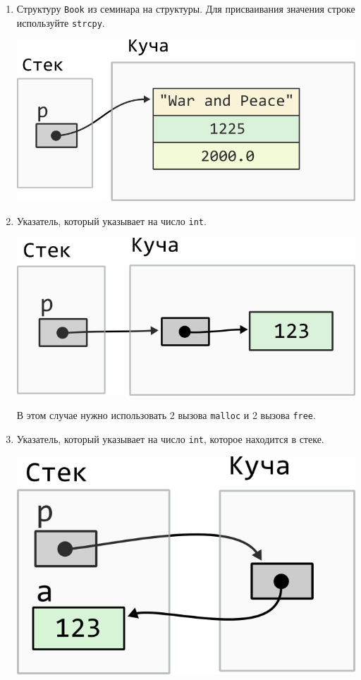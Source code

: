 \documentclass{article}
\begin{document}
\begin{enumerate}
\item Структуру \texttt{Book} из семинара на структуры. Для присваивания значения строке используйте \texttt{strcpy}.
\begin{center}
\includegraphics[scale=0.72]{../images/malloc_class_tasks/heap_struct_book.png}
\end{center}


\item Указатель, который указывает на число \texttt{int}.
\begin{center}
\includegraphics[scale=0.72]{../images/malloc_class_tasks/heap_pointer_int.png}
\end{center}
В этом случае нужно использовать 2 вызова \texttt{malloc} и 2 вызова \texttt{free}.

\newpage
\item Указатель, который указывает на число \texttt{int}, которое находится в стеке.
\begin{center}
\includegraphics[scale=0.72]{../images/malloc_class_tasks/heap_pointer_int_stack.png}
\end{center}


\end{enumerate}
\end{document}
